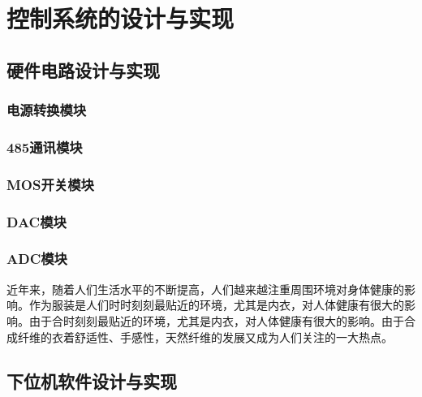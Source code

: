 \chapter{控制系统的设计与实现}
\label{chap:intro}
\section{硬件电路设计与实现}


\subsection{电源转换模块}

\subsection{485通讯模块}

\subsection{MOS开关模块}

\subsection{DAC模块}

\subsection{ADC模块}

近年来，随着人们生活水平的不断提高，人们越来越注重周围环境对身体健康的影响。作为服装是人们时时刻刻最贴近的环境，尤其是内衣，对人体健康有很大的影响。由于合时刻刻最贴近的环境，尤其是内衣，对人体健康有很大的影响。由于合成纤维的衣着舒适性、手感性，天然纤维的发展又成为人们关注的一大热点。\supercite{Takahashi1996Structure,Xia2002Analysis,Jiang1989,Mao2000Motion,Feng1998}


\section{下位机软件设计与实现}

